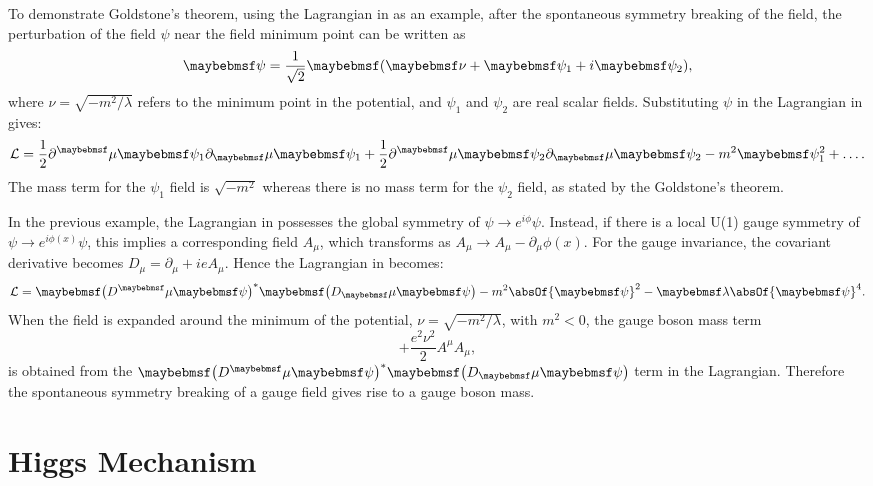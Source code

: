 To demonstrate Goldstone's theorem, using the Lagrangian in  as an example, after the spontaneous symmetry breaking of the field, the perturbation of the field $\psi$ near the field minimum point can be written as
 \begin{equation}
\psi = \frac{1}{\sqrt{2}}\parenths{\nu+\psi_1+i\psi_2},
\end{equation}
where $\nu=\sqrt{{-m^2}/{\lambda}}$ refers to the minimum point in the potential, and $\psi_1$ and $\psi_2$ are real scalar fields. Substituting $\psi$ in the Lagrangian in  gives:
\begin{equation}
\Lagr = \frac{1}{2}\partial^\mu{\psi_1}\partial_\mu\psi_1 + \frac{1}{2}\partial^\mu{\psi_2}\partial_\mu\psi_2 - m^2 \psi_1^2 + \hdots.
\end{equation}
The mass term for the $\psi_1$ field is $\sqrt{-m^2}$ whereas there is no mass term for the $\psi_2$ field, as stated by the Goldstone's theorem.

In the previous example, the Lagrangian in  possesses  the global symmetry of $\psi \to e^{i\phi}\psi$. Instead, if there is a local U(1) gauge symmetry of  $\psi \to e^{i\phi(x)}\psi$, this implies a corresponding field $A_{\mu}$, which transforms as $A_\mu \to A_\mu - \partial_\mu\phi(x)$. For the gauge invariance, the covariant derivative becomes $D_\mu = \partial_\mu+ieA_\mu$. Hence the Lagrangian in  becomes:
\begin{equation}
\Lagr = \parenths{D^\mu{\psi}}^*\parenths{D_\mu\psi} - m^2 \absOf{\psi}^2    - \lambda\absOf{\psi}^4.
\end{equation}
When the field is expanded around the minimum of the potential,  $\nu=\sqrt{{-m^2}/{\lambda}}$, with $m^2<0$,  the gauge boson mass term
\begin{equation}
+\frac{e^2\nu^2}{2}A^\mu{A}_\mu,
\end{equation}
 is obtained from the $\parenths{D^\mu{\psi}}^*\parenths{D_\mu\psi} $ term in the Lagrangian. Therefore the spontaneous symmetry breaking of a gauge field gives rise to a gauge boson mass.

\section{Higgs Mechanism}
\label{sec:theoryHiggs}

